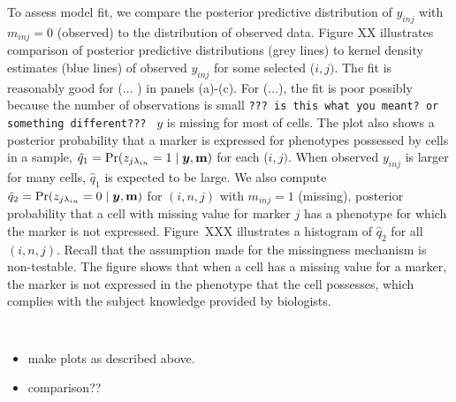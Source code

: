 \documentclass[12pt,]{article}
\def\Prob{\text{Pr}}
\newcommand{\bZ}{\mbox{\boldmath $Z$}}
\newcommand{\by}{\mbox{\boldmath $y$}}
\begin{document}



To assess model fit, we compare the posterior predictive distribution of
$y_{inj}$ with $m_{inj}=0$ (observed) to the distribution of observed data.
Figure XX illustrates comparison of posterior predictive distributions (grey
lines) to kernel density estimates (blue lines) of observed $y_{inj}$ for some
selected ($i,j)$. The fit is  reasonably good for (... ) in panels (a)-(c).
For (...), the fit is poor possibly because the number of observations is small
{\tt ??? is this what you meant? or something different??? } $y$ is missing for
most of cells.  The plot also shows a posterior probability that a marker is
expressed for phenotypes possessed by cells in a sample, $\hat{q}_1=\Prob(z_{j
\lambda_{in}}=1 \mid \by, \bf m)$ for each ($i,j)$. When observed $y_{inj}$ is
larger for many cells, $\hat{q}_1$ is expected to be large.  We also compute
$\hat{q}_2=\Prob(z_{j \lambda_{in}}=0 \mid \by, \bf m)$ for $(i,n,j)$ with
$m_{inj}=1$ (missing), posterior probability that a cell with missing value for
marker $j$ has a phenotype for which the marker is not expressed.  Figure~XXX
illustrates a histogram of $\hat{q}_2$ for all $(i, n, j)$.  Recall that the
assumption made for the missingness mechanism is non-testable.   The figure
shows that when a cell has a missing value for a marker, the marker is not
expressed in the phenotype that the cell possesses, which complies with the
subject knowledge provided by biologists.  



{\tt 
\begin{itemize}
\item make plots as described above.
\item comparison??
\end{itemize} }
\end{document}
